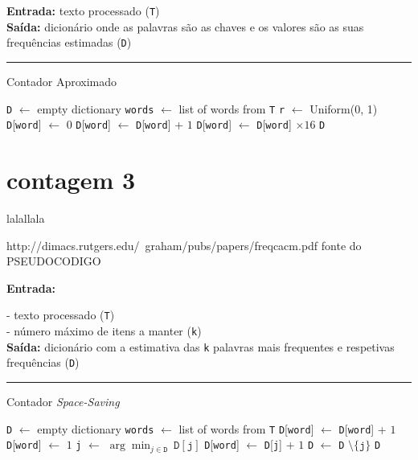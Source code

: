 \documentclass[mirror, portugues]{revdetua}
\begin{document}
\begin{algorithm}[H]
\raggedright
\textbf{Entrada:} texto processado (\texttt{T}) \\
\textbf{Saída:} dicionário onde as palavras são as chaves e os valores são as suas frequências estimadas (\texttt{D})\\
\hrule 
\caption{Contador Aproximado}
\begin{algorithmic}[1]
    \State \texttt{D} $\gets$ empty dictionary
    \State \texttt{words} $\gets$ list of words from \texttt{T}
    \State \texttt{r} $\gets$ Uniform(0, 1)
            \State \texttt{D}[\texttt{word}] $\gets$ 0
        \EndIf
        \State \texttt{D}[\texttt{word}] $\gets$ \texttt{D}[\texttt{word}] + $1$
    \EndIf
    \EndFor
     
    \State \texttt{D}[\texttt{word}] $\gets$ \texttt{D}[\texttt{word}] $\times 16$
    \EndFor
    \State \Return \texttt{D}
\end{algorithmic}
\end{algorithm}


\section{contagem 3}

lalallala


http://dimacs.rutgers.edu/~graham/pubs/papers/freqcacm.pdf fonte do PSEUDOCODIGO

\begin{algorithm}[H]
\raggedright
\textbf{Entrada:}

- texto processado (\texttt{T}) \\

- número máximo de itens a manter (\texttt{k}) \\

\textbf{Saída:} dicionário com a estimativa das \texttt{k} palavras mais frequentes e respetivas frequências (\texttt{D}) \\
\hrule 
\caption{Contador \textit{Space-Saving}}
\begin{algorithmic}[1]
    \State \texttt{D} $\gets$ empty dictionary
    \State \texttt{words} $\gets$ list of words from \texttt{T}
            \State \texttt{D}[\texttt{word}] $\gets$ \texttt{D}[\texttt{word}] + $1$
            \State \texttt{D}[\texttt{word}] $\gets$ $1$
        \Else
            \State \texttt{j} $\gets$ $\arg \min_{j \in \texttt{D}}\ \texttt{D}[\texttt{j}]$
            \State \texttt{D}[\texttt{word}] $\gets$ \texttt{D}[\texttt{j}] + $1$
            \State \texttt{D} $\gets$ \texttt{D} $\setminus \{\texttt{j}\}$
        \EndIf
    \EndFor
    \State \Return \texttt{D}
\end{algorithmic}
\end{algorithm}
\end{document}
